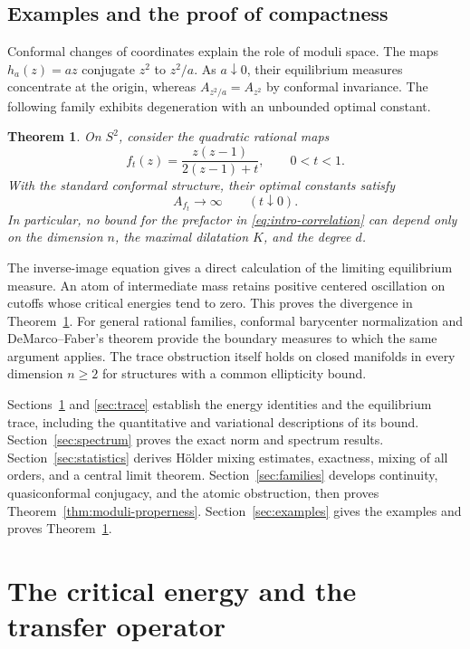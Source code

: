 \documentclass[10pt,a4paper]{amsart}
\newtheorem{theorem}{Theorem}[section]
\numberwithin{equation}{section}
\begin{document}
\subsection{Examples and the proof of compactness}

Conformal changes of coordinates explain the role of moduli space. The maps $h_a(z)=az$ conjugate $z^2$ to $z^2/a$. As $a\downarrow0$, their equilibrium measures concentrate at the origin, whereas $A_{z^2/a}=A_{z^2}$ by conformal invariance. The following family exhibits degeneration with an unbounded optimal constant.

\begin{theorem}\label{thm:nonuniform-intro}
On $S^2$, consider the quadratic rational maps
\begin{equation}\label{eq:degenerate-family}
 f_t(z)=\frac{z(z-1)}{2(z-1)+t},\qquad 0<t<1.
\end{equation}
With the standard conformal structure, their optimal constants satisfy
\[
 A_{f_t}\longrightarrow\infty\qquad(t\downarrow0).
\]
In particular, no bound for the prefactor in \eqref{eq:intro-correlation} can depend only on the dimension $n$, the maximal dilatation $K$, and the degree $d$.
\end{theorem}

The inverse-image equation gives a direct calculation of the limiting equilibrium measure. An atom of intermediate mass retains positive centered oscillation on cutoffs whose critical energies tend to zero. This proves the divergence in Theorem~\ref{thm:nonuniform-intro}. For general rational families, conformal barycenter normalization and DeMarco--Faber's theorem provide the boundary measures to which the same argument applies. The trace obstruction itself holds on closed manifolds in every dimension $n\ge2$ for structures with a common ellipticity bound.

Sections~\ref{sec:energy} and \ref{sec:trace} establish the energy identities and the equilibrium trace, including the quantitative and variational descriptions of its bound. Section~\ref{sec:spectrum} proves the exact norm and spectrum results. Section~\ref{sec:statistics} derives H\"older mixing estimates, exactness, mixing of all orders, and a central limit theorem. Section~\ref{sec:families} develops continuity, quasiconformal conjugacy, and the atomic obstruction, then proves Theorem~\ref{thm:moduli-properness}. Section~\ref{sec:examples} gives the examples and proves Theorem~\ref{thm:nonuniform-intro}.

\section{The critical energy and the transfer operator}\label{sec:energy}
\end{document}
